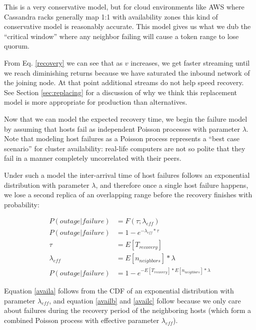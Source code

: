\documentclass{article}
\begin{document}
This is a very conservative model, but for cloud environments like AWS where
Cassandra racks generally map 1:1 with availability zones this kind of
conservative model is reasonably accurate. This model gives us what we dub the
``critical window'' where any neighbor failing will cause a token range to lose
quorum.

From Eq. \ref{recovery} we can see that as $v$ increases, we get faster
streaming until we reach diminishing returns because we have saturated the
inbound network of the joining node. At that point additional streams do not
help speed recovery. See Section \ref{sec:replacing} for a discussion of why
we think this replacement model is more appropriate for production than
alternatives.

Now that we can model the expected recovery time, we begin the failure model by
assuming that hosts fail as independent Poisson processes with parameter
$\lambda$. Note that modeling host failures as a Poisson process represents a
``best case scenario'' for cluster availability: real-life computers are not so
polite that they fail in a manner completely uncorrelated with their peers.

Under such a model the inter-arrival time of host failures follows an
exponential distribution with parameter $\lambda$, and therefore once a single
host failure happens, we lose a second replica of an overlapping range before
the recovery finishes with probability:

\begin{subequations} \label{avail}
\begin{align}
        P(outage|failure) & = F(\tau; \lambda_{eff}) \\ \label{availa}
        P(outage|failure) & = 1 - e^{-\lambda_{eff} * \tau} \\ \label{availb}
        \tau & = E[T_{recovery}] \\ \label{availc}
        \lambda_{eff} & = E[n_{neighbors}] * \lambda \\ \label{availd}
        P(outage|failure) & = 1 - e^{- E[T_{recovery}] * E[n_{neighbors}] * \lambda}
\end{align}
\end{subequations}

Equation \ref{availa} follows from the CDF of an exponential distribution with
parameter $\lambda_{eff}$, and equation \ref{availb} and \ref{availc} follow
because we only care about failures during the recovery period of the
neighboring hosts (which form a combined Poisson process with effective
parameter $\lambda_{eff}$).
\end{document}

